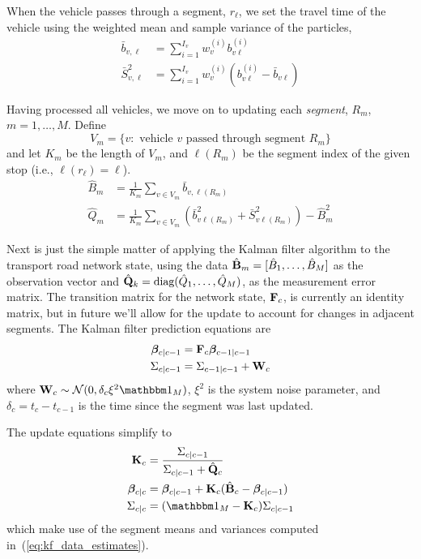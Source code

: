 \documentclass[draftcls,a4paper,onecolumn]{IEEEtran}\usepackage[]{graphicx}\usepackage[]{color}
\begin{document}
When the vehicle passes through a segment, $r_\ell$,
we set the travel time of the vehicle using the 
weighted mean and sample variance of the particles,
\begin{align}
  \label{eq:weighted_travel}
  \bar b_{v,\ell} &= \sum_{i=1}^{I_v} w_v^{(i)} b_{v\ell}^{(i)} \\
  \bar S_{v,\ell}^2 &= \sum_{i=1}^{I_v} w_v^{(i)}(b_{v\ell}^{(i)} - \bar b_{v\ell})
\end{align}


Having processed all vehicles, we move on to updating each \emph{segment},
$R_m$, $m = 1, \ldots, M$.
Define
\begin{equation*}
  V_m = \{v:\text{ vehicle $v$ passed through segment } R_m\}
\end{equation*}
and let $K_m$ be the length of $V_m$,
and $\ell(R_m)$ be the segment index of the given stop
(i.e., $\ell(r_\ell) = \ell$).
\begin{align}
  \label{eq:kf_data_estimates}
  \hat B_m &= \frac{1}{K_m} \sum_{v \in V_m} \bar b_{v,\ell(R_m)}  \\
  \hat Q_m &= \frac{1}{K_m} \sum_{v \in V_m} 
  \left(\bar b_{v\ell(R_m)}^2 + \bar S_{v\ell(R_m)}^2\right) - \hat B_m^2
\end{align}

Next is just the simple matter of applying the Kalman filter algorithm 
\cite{Anderson_2012} 
to the transport road network state,
using the data \mbox{$\hat {\mathbf{B}}_m = [\hat B_1, \ldots, \hat B_M]$} 
as the observation vector
and \mbox{$\hat {\mathbf{Q}}_k = \textrm{diag}(\hat Q_1, \ldots, \hat Q_M)$},
as the measurement error matrix.
The transition matrix for the network state, $\mathbf{F}_c$,
is currently an identity matrix,
but in future we'll allow for the update to account for
changes in adjacent segments.
The Kalman filter prediction equations are
\begin{align}
  \boldsymbol{\beta}_{c|c-1} &= \mathbf{F}_c\boldsymbol{\beta}_{c-1|c-1} \\
  \Sigma_{c|c-1} &= \Sigma_{c-1|c-1} + \mathbf{W}_c
\end{align}
where $\bW_c \sim \mathcal{N}(0, \delta_c\xi^2\eye_M)$, 
$\xi^2$ is the system noise parameter,
and $\delta_c = t_c - t_{c-1}$ is the time since the segment
was last updated.

The update equations simplify to
\begin{align}
  \bK_c &= \frac{\Sigma_{c|c-1}}{\Sigma_{c|c-1} + \hat {\mat Q}_c} \\
  \bbeta_{c|c} &= \bbeta_{c|c-1} + \bK_c(\hat {\mat B}_c - \bbeta_{c|c-1}) \\
  \Sigma_{c|c} &= (\eye_M - \bK_c) \Sigma_{c|c-1}
\end{align}
which make use of the segment means and variances computed in~(\ref{eq:kf_data_estimates}).
\end{document}
